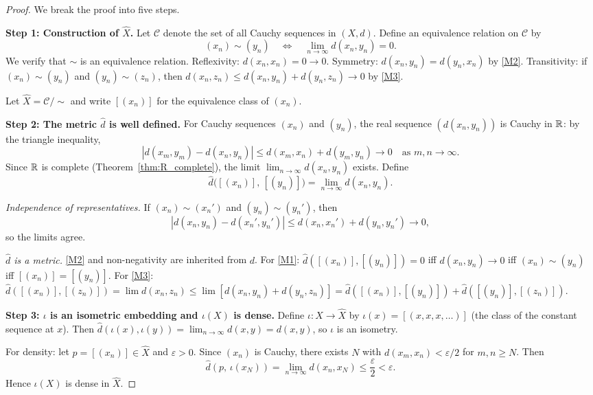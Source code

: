 \documentclass[11pt,a4paper]{article}
\begin{document}
\begin{proof}
We break the proof into five steps.

\textbf{Step 1: Construction of $\hat{X}$.}
Let $\mathcal{C}$ denote the set of all Cauchy sequences in $(X,d)$. Define
an equivalence relation on $\mathcal{C}$ by
\[
(x_n) \sim (y_n) \quad \iff \quad \lim_{n \to \infty} d(x_n, y_n) = 0.
\]
We verify that $\sim$ is an equivalence relation. Reflexivity: $d(x_n, x_n) = 0
\to 0$. Symmetry: $d(x_n, y_n) = d(y_n, x_n)$ by \ref{M2}. Transitivity: if
$(x_n) \sim (y_n)$ and $(y_n) \sim (z_n)$, then
$d(x_n, z_n) \le d(x_n, y_n) + d(y_n, z_n) \to 0$ by \ref{M3}.

Let $\hat{X} = \mathcal{C}/{\sim}$ and write $[(x_n)]$ for the equivalence
class of $(x_n)$.

\textbf{Step 2: The metric $\hat{d}$ is well defined.}
For Cauchy sequences $(x_n)$ and $(y_n)$, the real sequence $(d(x_n, y_n))$ is
Cauchy in $\mathbb{R}$: by the triangle inequality,
\[
|d(x_m, y_m) - d(x_n, y_n)| \le d(x_m, x_n) + d(y_m, y_n) \to 0
\quad \text{as } m, n \to \infty.
\]
Since $\mathbb{R}$ is complete (Theorem~\ref{thm:R_complete}), the limit
$\lim_{n \to \infty} d(x_n, y_n)$ exists. Define
\[
\hat{d}\bigl([(x_n)],\, [(y_n)]\bigr) = \lim_{n \to \infty} d(x_n, y_n).
\]

\emph{Independence of representatives.} If $(x_n) \sim (x_n')$ and
$(y_n) \sim (y_n')$, then
\[
|d(x_n, y_n) - d(x_n', y_n')| \le d(x_n, x_n') + d(y_n, y_n') \to 0,
\]
so the limits agree.

\emph{$\hat{d}$ is a metric.} \ref{M2} and non-negativity are inherited from
$d$. For \ref{M1}: $\hat{d}([(x_n)], [(y_n)]) = 0$ iff
$d(x_n, y_n) \to 0$ iff $(x_n) \sim (y_n)$ iff $[(x_n)] = [(y_n)]$.
For \ref{M3}:
$\hat{d}([(x_n)], [(z_n)]) = \lim d(x_n, z_n) \le \lim [d(x_n, y_n)
+ d(y_n, z_n)] = \hat{d}([(x_n)], [(y_n)]) + \hat{d}([(y_n)], [(z_n)])$.

\textbf{Step 3: $\iota$ is an isometric embedding and $\iota(X)$ is dense.}
Define $\iota \colon X \to \hat{X}$ by $\iota(x) = [(x, x, x, \ldots)]$
(the class of the constant sequence at $x$). Then
$\hat{d}(\iota(x), \iota(y)) = \lim_{n \to \infty} d(x, y) = d(x, y)$,
so $\iota$ is an isometry.

For density: let $p = [(x_n)] \in \hat{X}$ and $\varepsilon > 0$. Since
$(x_n)$ is Cauchy, there exists $N$ with $d(x_m, x_n) < \varepsilon/2$ for
$m, n \ge N$. Then
\[
\hat{d}(p,\, \iota(x_N)) = \lim_{n \to \infty} d(x_n, x_N) \le
\frac{\varepsilon}{2} < \varepsilon.
\]
Hence $\iota(X)$ is dense in $\hat{X}$.


\end{proof}
\end{document}

